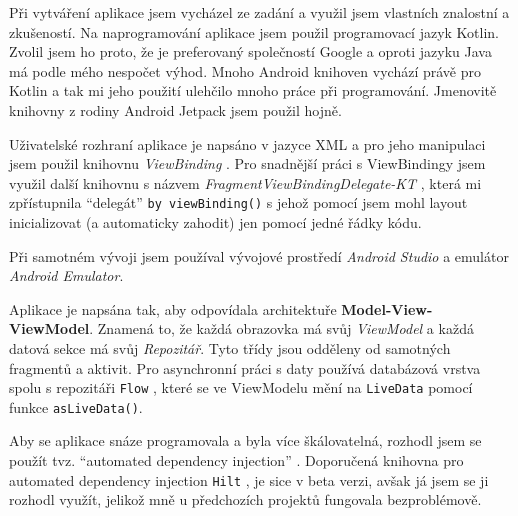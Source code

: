 \documentclass[../TakeYourPill.tex]{subfiles}
\begin{document}
Při vytváření aplikace jsem vycházel ze zadání a využil jsem vlastních znalostní a zkušeností. Na naprogramování aplikace jsem použil programovací jazyk Kotlin. Zvolil jsem ho proto, že je preferovaný společností Google a oproti jazyku Java má podle mého nespočet výhod. Mnoho Android knihoven vychází právě pro Kotlin a tak mi jeho použití ulehčilo mnoho práce při programování. Jmenovitě knihovny z rodiny Android Jetpack \cite{jetpack} jsem použil hojně.

Uživatelské rozhraní aplikace je napsáno v jazyce XML a pro jeho manipulaci jsem použil knihovnu \textit{ViewBinding} \cite{viewbinding}. Pro snadnější práci s ViewBindingy jsem využil další knihovnu s názvem \textit{FragmentViewBindingDelegate-KT} \cite{delegate}\cite{delegate2}, která mi zpřístupnila \enquote{delegát} \texttt{by viewBinding()} s jehož pomocí jsem mohl layout inicializovat (a automaticky zahodit) jen pomocí jedné řádky kódu.

Při samotném vývoji jsem používal vývojové prostředí \textit{Android Studio} \cite{studio} a emulátor \textit{Android Emulator}.

Aplikace je napsána tak, aby odpovídala architektuře \textbf{Model-View-ViewModel}. Znamená to, že každá obrazovka má svůj \textit{ViewModel} a každá datová sekce má svůj \textit{Repozitář}. Tyto třídy jsou odděleny od samotných fragmentů a aktivit. Pro asynchronní práci s daty používá databázová vrstva spolu s repozitáři \texttt{Flow} \cite{flow}, které se ve ViewModelu mění na \texttt{LiveData} \cite{livedata} pomocí funkce \texttt{asLiveData()}.






Aby se aplikace snáze programovala a byla více škálovatelná, rozhodl jsem se použít tvz. \enquote{automated dependency injection} \cite{di}. Doporučená knihovna pro automated dependency injection \texttt{Hilt} \cite{hilt}, je sice v beta verzi, avšak já jsem se ji rozhodl využít, jelikož mně u předchozích projektů fungovala bezproblémově.


\end{document}
